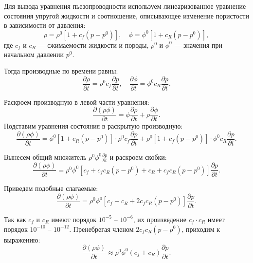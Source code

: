 \documentclass[12pt, a4paper]{article}
\begin{document}
Для вывода уравнения пьезопроводности используем линеаризованное уравнение состояния упругой жидкости и соотношение, описывающее изменение пористости в зависимости от давления:
\begin{equation}
    \rho = \rho^0 [1 + c_f (p - p^0)], \quad \phi = \phi^0 [1 + c_R (p - p^0)],
\end{equation}
где \(c_f\) и \(c_R\) — сжимаемости жидкости и породы, \(\rho^0\) и \(\phi^0\) — значения при начальном давлении \(p^0\).

Тогда производные по времени равны:
\begin{equation}
    \frac{\partial \rho}{\partial t} = \rho^0 c_f \frac{\partial p}{\partial t}, \quad \frac{\partial \phi}{\partial t} = \phi^0 c_R \frac{\partial p}{\partial t}.
\end{equation}

Раскроем производную в левой части уравнения:
\begin{equation}
    \frac{\partial (\rho \phi)}{\partial t} = \phi \frac{\partial \rho}{\partial t} + \rho \frac{\partial \phi}{\partial t}.
\end{equation}
Подставим уравнения состояния в раскрытую производную:
\begin{equation}
    \frac{\partial (\rho \phi)}{\partial t} = \phi^0 [1 + c_R (p - p^0)] \cdot \rho^0 c_f \frac{\partial p}{\partial t} + \rho^0 [1 + c_f (p - p^0)] \cdot \phi^0 c_R \frac{\partial p}{\partial t}.
\end{equation}

Вынесем общий множитель \(\rho^0 \phi^0 \frac{\partial p}{\partial t}\) и раскроем скобки:
\begin{equation}
    \frac{\partial (\rho \phi)}{\partial t} = \rho^0 \phi^0 [c_f + c_f c_R (p - p^0) + c_R + c_f c_R (p - p^0)] \frac{\partial p}{\partial t}.
\end{equation}

Приведем подобные слагаемые:
\begin{equation}
    \frac{\partial (\rho \phi)}{\partial t} = \rho^0 \phi^0 [c_f + c_R + 2 c_f c_R (p - p^0)] \frac{\partial p}{\partial t}.
\end{equation}

Так как \(c_f\) и \(c_R\) имеют порядок \(10^{-5}\) -- \(10^{-6}\), их произведение \(c_f \cdot c_R\) имеет порядок \(10^{-10}\) -- \(10^{-12}\). Пренебрегая членом \(2 c_f c_R (p - p^0)\), приходим к выражению:
\begin{equation}
    \frac{\partial (\rho \phi)}{\partial t} \approx \rho^0 \phi^0 (c_f + c_R) \frac{\partial p}{\partial t}.
\end{equation}
\end{document}

